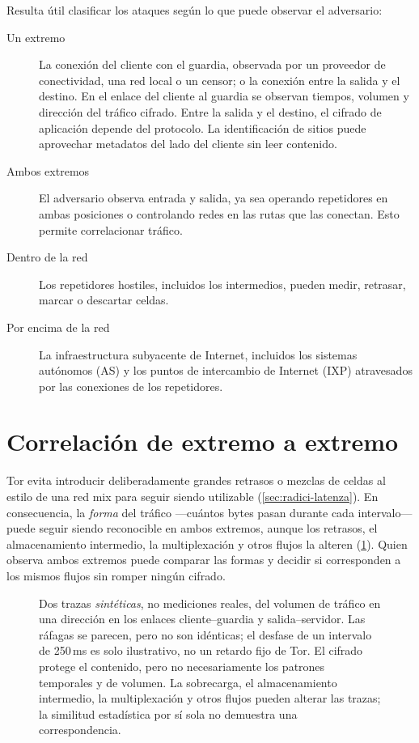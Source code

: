 Resulta útil clasificar los ataques según lo que puede observar el adversario:
\begin{description}
  \item[Un extremo] La conexión del cliente con el guardia, observada por un proveedor de conectividad, una red local o un censor; o la conexión entre la salida y el destino. En el enlace del cliente al guardia se observan tiempos, volumen y dirección del tráfico cifrado. Entre la salida y el destino, el cifrado de aplicación depende del protocolo. La identificación de sitios puede aprovechar metadatos del lado del cliente sin leer contenido.
  \item[Ambos extremos] El adversario observa entrada y salida, ya sea operando repetidores en ambas posiciones o controlando redes en las rutas que las conectan. Esto permite correlacionar tráfico.
  \item[Dentro de la red] Los repetidores hostiles, incluidos los intermedios, pueden medir, retrasar, marcar o descartar celdas.
  \item[Por encima de la red] La infraestructura subyacente de Internet, incluidos los sistemas autónomos (AS) y los puntos de intercambio de Internet (IXP) atravesados por las conexiones de los repetidores.
\end{description}

\section{Correlación de extremo a extremo}\label{sec:att-correlazione}

Tor evita introducir deliberadamente grandes retrasos o mezclas de celdas al estilo de una red mix para seguir siendo utilizable (\cref{sec:radici-latenza}). En consecuencia, la \emph{forma} del tráfico ---cuántos bytes pasan durante cada intervalo--- puede seguir siendo reconocible en ambos extremos, aunque los retrasos, el almacenamiento intermedio, la multiplexación y otros flujos la alteren (\cref{fig:correlazione}). Quien observa ambos extremos puede comparar las formas y decidir si corresponden a los mismos flujos sin romper ningún cifrado.

\begin{figure}[htbp]
\centering

\caption{Dos trazas \emph{sintéticas}, no mediciones reales, del volumen de tráfico en una dirección en los enlaces cliente--guardia y salida--servidor. Las ráfagas se parecen, pero no son idénticas; el desfase de un intervalo de 250\,ms es solo ilustrativo, no un retardo fijo de Tor. El cifrado protege el contenido, pero no necesariamente los patrones temporales y de volumen. La sobrecarga, el almacenamiento intermedio, la multiplexación y otros flujos pueden alterar las trazas; la similitud estadística por sí sola no demuestra una correspondencia.}
\label{fig:correlazione}
\end{figure}

